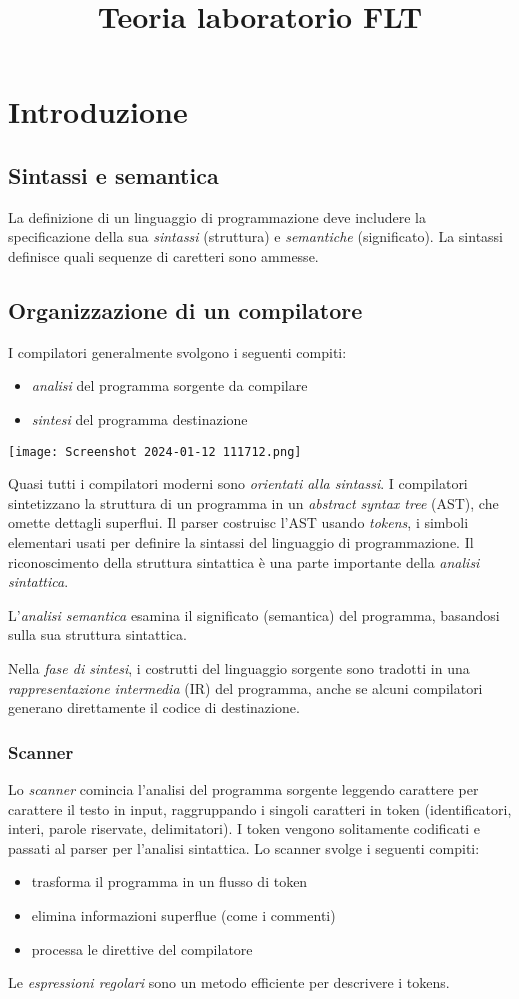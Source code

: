 \documentclass[11pt]{article}
\title{Teoria laboratorio FLT}
\begin{document}
\section{Introduzione}
\subsection{Sintassi e semantica}
La definizione di un linguaggio di programmazione deve includere la specificazione della sua \textit{sintassi} (struttura)
e \textit{semantiche} (significato). La sintassi definisce quali sequenze di caretteri sono ammesse.
\subsection{Organizzazione di un compilatore}
I compilatori generalmente svolgono i seguenti compiti:
\begin{itemize}
    \item \textit{analisi} del programma sorgente da compilare 
    \item \textit{sintesi} del programma destinazione 
\end{itemize}
\begin{center}
    \texttt{[image: Screenshot 2024-01-12 111712.png]}
\end{center}
Quasi tutti i compilatori moderni sono \textit{orientati alla sintassi}. I compilatori sintetizzano la struttura di un 
programma in un \textit{abstract syntax tree} (AST), che omette dettagli superflui. Il parser costruisc l'AST usando 
\textit{tokens}, i simboli elementari usati per definire la sintassi del linguaggio di programmazione. Il riconoscimento
della struttura sintattica è una parte importante della \textit{analisi sintattica}.

L'\textit{analisi semantica} esamina il significato (semantica) del programma, basandosi sulla sua struttura sintattica.

Nella \textit{fase di sintesi}, i costrutti del linguaggio sorgente sono tradotti in una \textit{rappresentazione
intermedia} (IR) del programma, anche se alcuni compilatori generano direttamente il codice di destinazione.
\subsubsection{Scanner}
Lo \textit{scanner} comincia l'analisi del programma sorgente leggendo carattere per carattere il testo in input, raggruppando 
i singoli caratteri in token (identificatori, interi, parole riservate, delimitatori). I token vengono solitamente codificati 
e passati al parser per l'analisi sintattica. Lo scanner svolge i seguenti compiti:
\begin{itemize}
    \item trasforma il programma in un flusso di token 
    \item elimina informazioni superflue (come i commenti)
    \item processa le direttive del compilatore
\end{itemize}
Le \textit{espressioni regolari} sono un metodo efficiente per descrivere i tokens.
\end{document}
